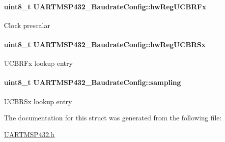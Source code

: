 \paragraph[{hw\+Reg\+U\+C\+B\+R\+Fx}]{\setlength{\rightskip}{0pt plus 5cm}uint8\+\_\+t U\+A\+R\+T\+M\+S\+P432\+\_\+\+Baudrate\+Config\+::hw\+Reg\+U\+C\+B\+R\+Fx}\label{struct_u_a_r_t_m_s_p432___baudrate_config_ab0bd32e5fbee49e6f205aefed9b16407}
Clock prescalar 
\paragraph[{hw\+Reg\+U\+C\+B\+R\+Sx}]{\setlength{\rightskip}{0pt plus 5cm}uint8\+\_\+t U\+A\+R\+T\+M\+S\+P432\+\_\+\+Baudrate\+Config\+::hw\+Reg\+U\+C\+B\+R\+Sx}\label{struct_u_a_r_t_m_s_p432___baudrate_config_a32214f6731b6cbaa74b3498e7e3f0732}
U\+C\+B\+R\+Fx lookup entry 
\paragraph[{sampling}]{\setlength{\rightskip}{0pt plus 5cm}uint8\+\_\+t U\+A\+R\+T\+M\+S\+P432\+\_\+\+Baudrate\+Config\+::sampling}\label{struct_u_a_r_t_m_s_p432___baudrate_config_a8c636ac0031b571cf9821758ce85a3de}
U\+C\+B\+R\+Sx lookup entry 

The documentation for this struct was generated from the following file\+:\begin{DoxyCompactItemize}
\item 
\hyperlink{_u_a_r_t_m_s_p432_8h}{U\+A\+R\+T\+M\+S\+P432.\+h}\end{DoxyCompactItemize}
